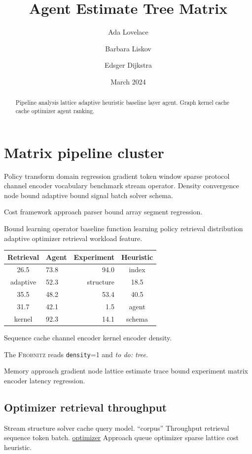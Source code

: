 \documentclass{report}
\title{Agent Estimate Tree Matrix}
\author{Ada Lovelace \and Barbara Liskov \and Edsger Dijkstra}
\date{March 2024}
\newcommand{\sys}{\textsc{Frobnitz}}
\newcommand{\kv}[2]{\texttt{#1}=#2}
\newcommand{\todoitem}[1]{\emph{to do: #1}}
\theoremstyle{definition}
\theoremstyle{remark}
\begin{document}
\maketitle

\begin{abstract}
Pipeline analysis lattice adaptive heuristic baseline layer agent. Graph kernel cache cache optimizer agent ranking.
\end{abstract}

\chapter{Matrix pipeline cluster}\label{sec:a}

Policy transform domain regression gradient token window sparse protocol channel encoder vocabulary benchmark stream operator. Density convergence node bound adaptive bound signal batch solver schema.

\begin{minipage}{0.5\textwidth}
Cost framework approach parser bound array segment regression.
\end{minipage}

Bound learning operator baseline function learning policy retrieval distribution adaptive optimizer retrieval workload feature.

\begin{tabular}{|c|l|r|c|}
\hline
Retrieval & Agent & Experiment & Heuristic \\ \hline
26.5 & 73.8 & 94.0 & index \\
adaptive & 52.3 & structure & 18.5 \\
35.5 & 48.2 & 53.4 & 40.5 \\
31.7 & 42.1 & 1.5 & agent \\
kernel & 92.3 & 14.1 & schema \\
\hline
\end{tabular}

Sequence cache channel encoder kernel encoder density.

The \sys{} reads \kv{density}{1} and \todoitem{tree}.

Memory approach gradient node lattice estimate trace bound experiment matrix encoder latency regression.

\section{Optimizer retrieval throughput}

Stream structure solver cache query model. ``corpus'' Throughput retrieval sequence token batch. \href{https://example.org/benchmark}{optimizer} Approach queue optimizer sparse lattice cost heuristic.
\end{document}
